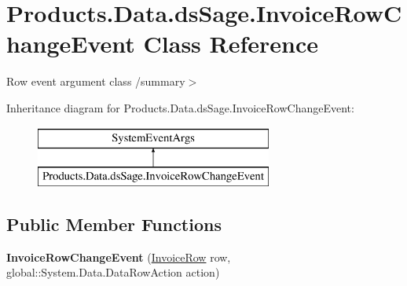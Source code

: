 \hypertarget{class_products_1_1_data_1_1ds_sage_1_1_invoice_row_change_event}{}\section{Products.\+Data.\+ds\+Sage.\+Invoice\+Row\+Change\+Event Class Reference}
\label{class_products_1_1_data_1_1ds_sage_1_1_invoice_row_change_event}


Row event argument class /summary$>$  


Inheritance diagram for Products.\+Data.\+ds\+Sage.\+Invoice\+Row\+Change\+Event\+:\begin{figure}[H]
\begin{center}
\leavevmode
\includegraphics[height=2.000000cm]{class_products_1_1_data_1_1ds_sage_1_1_invoice_row_change_event}
\end{center}
\end{figure}
\subsection*{Public Member Functions}
\begin{DoxyCompactItemize}
\item 
{\bfseries Invoice\+Row\+Change\+Event} (\hyperlink{class_products_1_1_data_1_1ds_sage_1_1_invoice_row}{Invoice\+Row} row, global\+::\+System.\+Data.\+Data\+Row\+Action action)\hypertarget{class_products_1_1_data_1_1ds_sage_1_1_invoice_row_change_event_a0f3e6dd205337de5dcea53c1ef0ee19c}{}\label{class_products_1_1_data_1_1ds_sage_1_1_invoice_row_change_event_a0f3e6dd205337de5dcea53c1ef0ee19c}

\end{DoxyCompactItemize}
